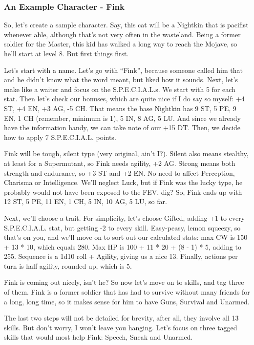 \documentclass[11pt]{article} %
\begin{document}
\subsubsection{An Example Character - Fink}

So, let's create a sample character. Say, this cat will be a Nightkin that is pacifist whenever able, although that's not very often in the wasteland. Being a former soldier for the Master, this kid has walked a long way to reach the Mojave, so he'll start at level 8. But first things first.

Let's start with a name. Let's go with ``Fink'', because someone called him that and he didn't know what the word meant, but liked how it sounds. Next, let's make like a waiter and focus on the S.P.E.C.I.A.L.s. We start with 5 for each stat. Then let's check our bonuses, which are quite nice if I do say so myself: +4 ST, +4 EN, +3 AG, -5 CH. That means the base Nightkin has 9 ST, 5 PE, 9 EN, 1 CH (remember, minimum is 1), 5 IN, 8 AG, 5 LU. And since we already have the information handy, we can take note of our +15 DT. Then, we decide how to apply 7 S.P.E.C.I.A.L. points. 

Fink will be tough, silent type (very original, ain't I?). Silent also means stealthy, at least for a Supermutant, so Fink needs agility, +2 AG. Strong means both strength and endurance, so +3 ST and +2 EN. No need to affect Perception, Charisma or Intelligence. We'll neglect Luck, but if Fink was the lucky type, he probably would not have been exposed to the FEV, dig? So, Fink ends up with 12 ST, 5 PE, 11 EN, 1 CH, 5 IN, 10 AG, 5 LU, so far.

Next, we'll choose a trait. For simplicity, let's choose Gifted, adding +1 to every S.P.E.C.I.A.L. stat, but getting -2 to every skill. Easy-peasy, lemon squeezy, so that's on you, and we'll move on to sort out our calculated stats: max CW is 150 + 13 * 10, which equals 280. Max HP is 100 + 11 * 20 + (8 - 1) * 5, adding to 255. Sequence is a 1d10 roll + Agility, giving us a nice 13. Finally, actions per turn is half agility, rounded up, which is 5.

Fink is coming out nicely, isn't he? So now let's move on to skills, and tag three of them. Fink is a former soldier that has had to survive without many friends for a long, long time, so it makes sense for him to have Guns, Survival and Unarmed. 

The last two steps will not be detailed for brevity, after all, they involve all 13 skills. But don't worry, I won't leave you hanging. Let's focus on three tagged skills that would most help Fink: Speech, Sneak and Unarmed.
\end{document}
